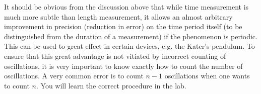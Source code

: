 It should be obvious from the discussion above that while time measurement is much more subtle than length measurement, it allows an almost arbitrary improvement in precision (reduction in error) on the time period itself (to be distinguished from the duration of a measurement)  if the phenomenon is periodic. This can be used to great effect in certain devices, e.g. the Kater's pendulum. To ensure that this great advantage is not vitiated by incorrect counting of oscillations, it is very important to know exactly how to count the number of oscillations. A very common error is to count $n-1$ oscillations when one wants to count $n$. You will learn the correct procedure in the lab. 





